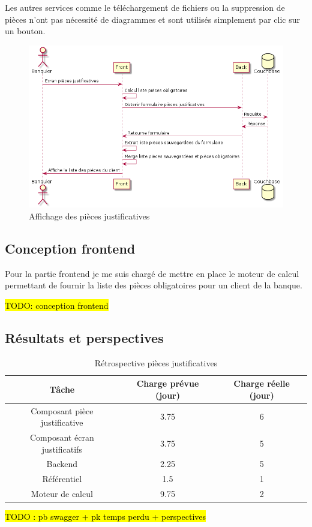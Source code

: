 	Les autres services comme le téléchargement de fichiers ou la suppression de pièces n'ont pas nécessité de diagrammes et sont utilisés simplement par clic sur un bouton. \\

\begin{figure}[h!]
	\includegraphics[scale=0.55]{images/travailBP1818/piecesJustif/seqGet.png}
	\centering
	\caption{Affichage des pièces justificatives}
	\label{seqGet}
\end{figure}

\subsection{Conception frontend}
	
	Pour la partie frontend je me suis chargé de mettre en place le moteur de calcul permettant de fournir la liste des pièces obligatoires pour un client de la banque.

\hl{TODO: conception frontend}

\subsection{Résultats et perspectives}

\begin{table}[h!]
	\center
	\begin{tabular}{| c | c | c |}
     \hline
     Tâche & Charge prévue (jour) & Charge réelle (jour) \\ \hline
     Composant pièce justificative & 3.75 & 6\\ \hline
     Composant écran justificatifs & 3.75 & 5\\ \hline
     Backend & 2.25 & 5\\ \hline
     Référentiel & 1.5 & 1\\ \hline
     Moteur de calcul & 9.75 & 2\\
     \hline
	\end{tabular}
	\caption{Rétrospective pièces justificatives}
	\label{retroPJ}
\end{table}
	
	\hl{TODO : pb swagger + pk temps perdu + perspectives}